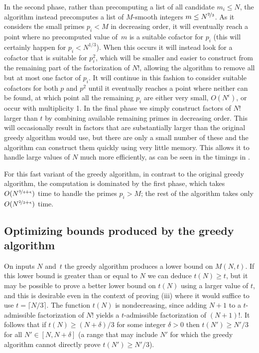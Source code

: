 \documentclass[10pt,a4paper,reqno]{amsart}
\numberwithin{equation}{section}
\theoremstyle{plain}
\theoremstyle{definition}
\begin{document}
In the second phase, rather than precomputing a list of all candidate $m_i\le N$, the algorithm instead precomputes a list of $M$-smooth integers $m\le N^{\nicefrac{2}{3}}$.  As it considers the small primes $p_i < M$ in decreasing order, it will eventually reach a point where no precomputed value of~$m$ is a suitable cofactor for $p_i$ (this will certainly happen for $p_i < N^{1/3}$).  When this occurs it will instead look for a cofactor that is suitable for $p_i^2$, which will be smaller and easier to construct from the remaining part of the factorization of $N!$, allowing the algorithm to remove all but at most one factor of $p_i$.  It will continue in this fashion to consider suitable cofactors for both $p$ and $p^2$ until it eventually reaches a point where neither can be found, at which point all the remaining $p_i$ are either very small, $O(N^\epsilon)$, or occur with multiplicity 1.  In the final phase we simply construct factors of $N!$ larger than $t$ by combining available remaining primes in decreasing order.  This will occasionally result in factors that are substantially larger than the original greedy algorithm would use, but there are only a small number of these and the algorithm can construct them quickly using very little memory.  This allows it to handle large values of $N$ much more efficiently, as can be seen in the timings in .

For this fast variant of the greedy algorithm, in contrast to the original greedy algorithm, the computation is dominated by the first phase, which takes $O(N^{\nicefrac{3}{4}+\epsilon})$ time to handle the primes $p_i>M$; the rest of the algorithm takes only $O(N^{\nicefrac{2}{3}+\epsilon})$ time.

\subsection{Optimizing bounds produced by the greedy algorithm}
On inputs $N$ and~$t$ the greedy algorithm produces a lower bound on $M(N,t)$. If this lower bound is greater than or equal to $N$ we can deduce $t(N)\ge t$, but it may be possible to prove a better lower bound on $t(N)$ using a larger value of $t$, and this is desirable even in the context of proving (iii) where it would suffice to use $t=\lceil N/3\rceil$.  The function $t(N)$ is nondecreasing, since adding $N+1$ to a $t$-admissible factorization of $N!$ yields a $t$-admissible factorization of $(N+1)!$. It follows that if $t(N) \ge (N+\delta)/3$ for some integer $\delta >0$ then $t(N')\ge N'/3$ for all $N'\in [N,N+\delta]$ (a range that may include $N'$ for which the greedy algorithm cannot directly prove $t(N')\ge N'/3$).
\end{document}

